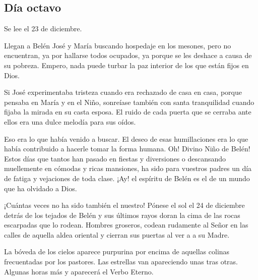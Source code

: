 \documentclass[spanish,utf8,twocolumn]{chlart}
\newenvironment{summary}{\begingroup
	\small\sffamily\itshape%
	\setlength{\leftskip}{3em}\setlength{\rightskip}{3em}\noindent
	}{\par\endgroup}
\newenvironment{lectura}{\begingroup\color{lector}}{\endgroup\par}
\begin{document}
\subsection*{Día octavo}
\begin{summary}
Se lee el 23 de diciembre.
\end{summary}
\begin{lectura}
Llegan a Belén José y María buscando hospedaje en los mesones, pero no
encuentran, ya por hallarse todos ocupados, ya porque se les deshace a
causa de su pobreza.
Empero, nada puede turbar la paz interior de los que están fijos en
Dios.

Si José experimentaba tristeza cuando era rechazado de casa en casa,
porque pensaba en María y en el Niño, sonreíase también con santa
tranquilidad cuando fijaba la mirada en su casta esposa.
El ruido de cada puerta que se cerraba ante ellos era una dulce melodía
para sus oídos.

Eso era lo que había venido a buscar.
El deseo de esas humillaciones era lo que había contribuido a hacerle
tomar la forma humana.
Oh!
Divino Niño de Belén!
Estos días que tantos han pasado en fiestas y diversiones o descansando
muellemente en cómodas y ricas mansiones, ha sido para vuestros padres
un día de fatiga y vejaciones de toda clase.
¡Ay!
el espíritu de Belén es el de un mundo que ha olvidado a Dios.

¡Cuántas veces no ha sido también el nuestro!
Pónese el sol el 24 de diciembre detrás de los tejados de Belén y sus
últimos rayos doran la cima de las rocas escarpadas que lo rodean.
Hombres groseros, codean rudamente al Señor en las calles de aquella
aldea oriental y cierran sus puertas al ver a a su Madre.

La bóveda de los cielos aparece purpurina por encima de aquellas colinas
frecuentadas por los pastores.
Las estrellas van apareciendo unas tras otras.
Algunas horas más y aparecerá el Verbo Eterno.
\end{lectura}
\end{document}
